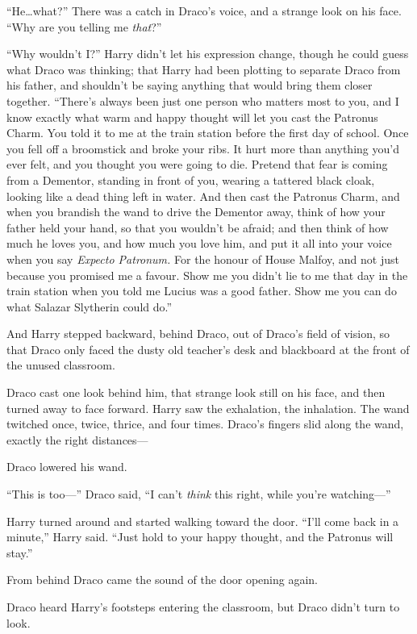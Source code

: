 “He…what?” There was a catch in Draco’s voice, and a strange look on his face. “Why are you telling me \emph{that}?”

“Why wouldn’t I?” Harry didn’t let his expression change, though he could guess what Draco was thinking; that Harry had been plotting to separate Draco from his father, and shouldn’t be saying anything that would bring them closer together. “There’s always been just one person who matters most to you, and I know exactly what warm and happy thought will let you cast the Patronus Charm. You told it to me at the train station before the first day of school. Once you fell off a broomstick and broke your ribs. It hurt more than anything you’d ever felt, and you thought you were going to die. Pretend that fear is coming from a Dementor, standing in front of you, wearing a tattered black cloak, looking like a dead thing left in water. And then cast the Patronus Charm, and when you brandish the wand to drive the Dementor away, think of how your father held your hand, so that you wouldn’t be afraid; and then think of how much he loves you, and how much you love him, and put it all into your voice when you say \emph{Expecto Patronum.} For the honour of House Malfoy, and not just because you promised me a favour. Show me you didn’t lie to me that day in the train station when you told me Lucius was a good father. Show me you can do what Salazar Slytherin could do.”

And Harry stepped backward, behind Draco, out of Draco’s field of vision, so that Draco only faced the dusty old teacher’s desk and blackboard at the front of the unused classroom.

Draco cast one look behind him, that strange look still on his face, and then turned away to face forward. Harry saw the exhalation, the inhalation. The wand twitched once, twice, thrice, and four times. Draco’s fingers slid along the wand, exactly the right distances—

Draco lowered his wand.

“This is too—” Draco said, “I can’t \emph{think} this right, while you’re watching—”

Harry turned around and started walking toward the door. “I’ll come back in a minute,” Harry said. “Just hold to your happy thought, and the Patronus will stay.”

\later

From behind Draco came the sound of the door opening again.

Draco heard Harry’s footsteps entering the classroom, but Draco didn’t turn to look.

